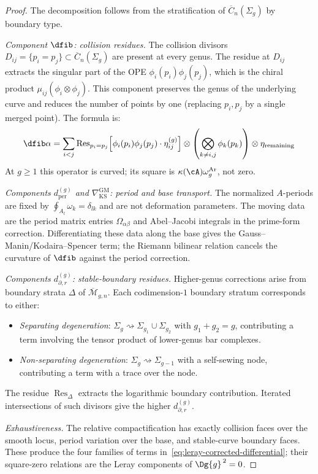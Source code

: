 \begin{proof}
The decomposition follows from the stratification of $\overline{C}_n(\Sigma_g)$ by boundary type.

\emph{Component $\dfib$: collision residues.}
The collision divisors $D_{ij} = \{p_i = p_j\} \subset \overline{C}_n(\Sigma_g)$ are present at every genus. The residue at $D_{ij}$ extracts the singular part of the OPE $\phi_i(p_i) \phi_j(p_j)$, which is the chiral product $\mu_{ij}(\phi_i \otimes \phi_j)$. This component preserves the genus of the underlying curve and reduces the number of points by one (replacing $p_i, p_j$ by a single merged point). The formula is:
\[
\dfib\alpha = \sum_{i<j} \mathrm{Res}_{p_i = p_j}\!\left[\phi_i(p_i) \phi_j(p_j) \cdot \eta_{ij}^{(g)}\right] \otimes \left(\bigotimes_{k \neq i,j} \phi_k(p_k)\right) \otimes \eta_{\mathrm{remaining}}
\]
At $g\geq1$ this operator is curved; its square is
$\kappa(\cA)\omega_g^{\mathrm{Ar}}$, not zero.

\emph{Components $d_{\mathrm{per}}^{(g)}$ and
$\nabla_{\mathrm{KS}}^{\mathrm{GM}}$: period and base transport.}
The normalized $A$-periods are fixed by
$\oint_{A_l}\omega_k=\delta_{lk}$ and are not deformation
parameters. The moving data are the period matrix entries
$\Omega_{\alpha\beta}$ and Abel--Jacobi integrals in the prime-form
correction. Differentiating these data along the base gives the
Gauss--Manin/Kodaira--Spencer term; the Riemann bilinear relation
cancels the curvature of $\dfib$ against the period correction.

\emph{Components $d_{\partial,r}^{(g)}$: stable-boundary residues.}
Higher-genus corrections arise from boundary strata $\Delta$ of
$\overline{\mathcal{M}}_{g,n}$. Each codimension-$1$ boundary
stratum corresponds to either:
\begin{itemize}
\item \emph{Separating degeneration}: $\Sigma_g \rightsquigarrow \Sigma_{g_1} \cup \Sigma_{g_2}$ with $g_1 + g_2 = g$, contributing a term involving the tensor product of lower-genus bar complexes.
\item \emph{Non-separating degeneration}: $\Sigma_g \rightsquigarrow \Sigma_{g-1}$ with a self-sewing node, contributing a term with a trace over the node.
\end{itemize}
The residue $\operatorname{Res}_\Delta$ extracts the logarithmic
boundary contribution. Iterated intersections of such divisors give
the higher $d_{\partial,r}^{(g)}$.

\emph{Exhaustiveness.} The relative compactification has exactly
collision faces over the smooth locus, period variation over the
base, and stable-curve boundary faces. These produce the four
families of terms in~\eqref{eq:leray-corrected-differential};
their square-zero relations are the Leray components of
$\Dg{g}^{\,2}=0$.
\end{proof}

